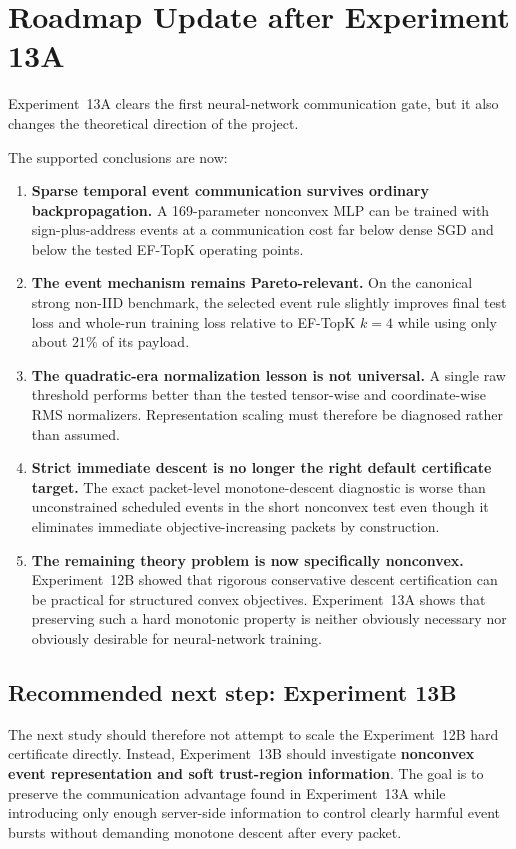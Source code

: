 \section{Roadmap Update after Experiment 13A}
\label{sec:roadmap-post-13a}

Experiment~13A clears the first neural-network communication gate, but it also changes the theoretical direction of the project.

The supported conclusions are now:
\begin{enumerate}
  \item \textbf{Sparse temporal event communication survives ordinary backpropagation.} A 169-parameter nonconvex MLP can be trained with sign-plus-address events at a communication cost far below dense SGD and below the tested EF-TopK operating points.
  \item \textbf{The event mechanism remains Pareto-relevant.} On the canonical strong non-IID benchmark, the selected event rule slightly improves final test loss and whole-run training loss relative to EF-TopK $k=4$ while using only about $21\%$ of its payload.
  \item \textbf{The quadratic-era normalization lesson is not universal.} A single raw threshold performs better than the tested tensor-wise and coordinate-wise RMS normalizers. Representation scaling must therefore be diagnosed rather than assumed.
  \item \textbf{Strict immediate descent is no longer the right default certificate target.} The exact packet-level monotone-descent diagnostic is worse than unconstrained scheduled events in the short nonconvex test even though it eliminates immediate objective-increasing packets by construction.
  \item \textbf{The remaining theory problem is now specifically nonconvex.} Experiment~12B showed that rigorous conservative descent certification can be practical for structured convex objectives. Experiment~13A shows that preserving such a hard monotonic property is neither obviously necessary nor obviously desirable for neural-network training.
\end{enumerate}

\subsection{Recommended next step: Experiment 13B}

The next study should therefore not attempt to scale the Experiment~12B hard certificate directly. Instead, Experiment~13B should investigate \textbf{nonconvex event representation and soft trust-region information}. The goal is to preserve the communication advantage found in Experiment~13A while introducing only enough server-side information to control clearly harmful event bursts without demanding monotone descent after every packet.

